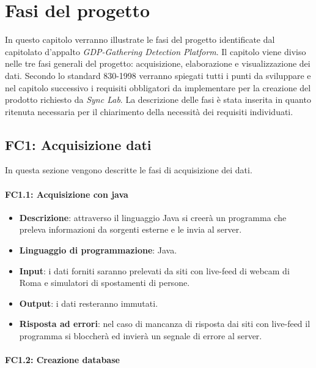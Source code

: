 \chapter{Fasi del progetto}
In questo capitolo verranno illustrate le fasi del progetto identificate dal capitolato d'appalto \textit{GDP-Gathering Detection Platform}. Il capitolo viene diviso nelle tre fasi generali del progetto: acquisizione, elaborazione e visualizzazione dei dati. Secondo lo standard 830-1998 verranno spiegati tutti i punti da sviluppare e nel capitolo successivo i requisiti obbligatori da implementare per la creazione del prodotto richiesto da \textit{Sync Lab}. La descrizione delle fasi è stata inserita in quanto ritenuta necessaria per il chiarimento della necessità dei requisiti individuati. %

\section{FC1: Acquisizione dati}%
In questa sezione vengono descritte le fasi di acquisizione dei dati.

\subsubsection{FC1.1: Acquisizione con java}

\begin{itemize}
	\item \textbf{Descrizione}: attraverso il linguaggio Java si creerà un programma che preleva informazioni da sorgenti esterne e le invia al server.
	\item \textbf{Linguaggio di programmazione}: Java.
	\item \textbf{Input}: i dati forniti saranno prelevati da siti con live-feed di webcam di Roma e simulatori di spostamenti di persone.
	\item \textbf{Output}: i dati resteranno immutati.
	\item \textbf{Risposta ad errori}: nel caso di mancanza di risposta dai siti con live-feed il programma si bloccherà ed invierà un segnale di errore al server.
\end{itemize}


\subsubsection{FC1.2: Creazione database}

